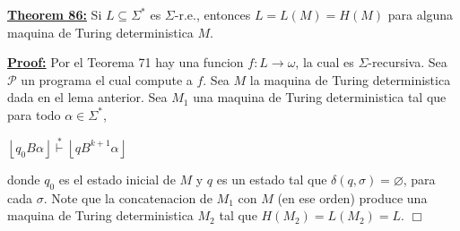 \textbf{\underline{Theorem 86:}} Si \(L\subseteq \Sigma ^{\ast }\) es \(\Sigma \)-r.e., entonces \(L=L(M)=H(M)\) para alguna maquina de Turing deterministica \(M.\)


\textbf{\underline{Proof:}} Por el Teorema 71 hay una funcion \(f:L\rightarrow \omega \), la cual es \(\Sigma \)-recursiva\(.\) Sea \(\mathcal{P}\) un programa el cual compute a \(f\). Sea \(M\) la maquina de Turing deterministica dada en el lema anterior. Sea \(M_{1}\) una maquina de Turing deterministica tal que para todo \(\alpha \in \Sigma ^{\ast }\),

\(\displaystyle \left\lfloor q_{0}B\alpha \right\rfloor \overset{\ast }{\vdash }\left\lfloor qB^{k+1}\alpha \right\rfloor \)

donde \(q_{0}\) es el estado inicial de \(M\) y \(q\) es un estado tal que \(\delta (q,\sigma )=\varnothing \), para cada \(\sigma \). Note que la concatenacion de \( M_{1}\) con \(M\) (en ese orden) produce una maquina de Turing deterministica \( M_{2}\) tal que \(H(M_{2})=L(M_{2})=L\). \(\Box\)
